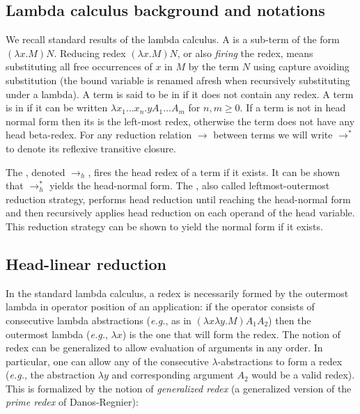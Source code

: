 \documentclass{elsarticle}
\makeatletter
\theoremstyle{plain}
\theoremstyle{definition}
\theoremstyle{remark}
\renewcommand\eg{{\it e.g.\@\xspace}}
\makeatother
\begin{document}
\subsection{Lambda calculus background and notations}
We recall standard results of the lambda calculus.
A  is a sub-term of the form $(\lambda x. M) N$.
Reducing redex $(\lambda x. M) N$, or also \emph{firing} the redex, means substituting all free occurrences of $x$ in $M$ by the term $N$ using capture avoiding substitution (the bound variable is renamed afresh when recursively substituting under a lambda).
A term is said to be in  if it does not contain any redex.
A term is in  if it can be written $\lambda x_1 \ldots x_n . y A_1 \ldots A_m$ for $n,m\geq0$. If a term is not in head normal form then its  is the left-most redex, otherwise the term does not have any head beta-redex. For any reduction relation $\rightarrow$ between terms we will write
$\rightarrow^*$ to denote its reflexive transitive closure.

The , denoted $\rightarrow_{h}$, fires the head redex of a term if it exists. It can be shown that $\rightarrow^*_{h}$ yields the head-normal form. The , also called leftmost-outermost reduction strategy, performs head reduction until reaching the head-normal form and then recursively applies head reduction on each operand of the head variable. This reduction strategy can be shown to yield the normal form if it exists.


\subsection{Head-linear reduction}
In the standard lambda calculus, a redex is necessarily formed by the outermost lambda in operator position of an application: if the operator consists of consecutive lambda abstractions (\eg, as in $(\lambda x \lambda y . M) A_1 A_2$) then the outermost lambda (\eg, $\lambda x$) is the one that will form the redex. The notion of redex can be generalized to allow evaluation of arguments in any order. In particular, one can allow any of the consecutive $\lambda$-abstractions to form a redex (\eg, the abstraction $\lambda y$ and corresponding argument $A_2$ would be a valid redex). This is formalized by the notion of \emph{generalized redex} (a generalized version of the \emph{prime redex} of Danos-Regnier):
\end{document}
